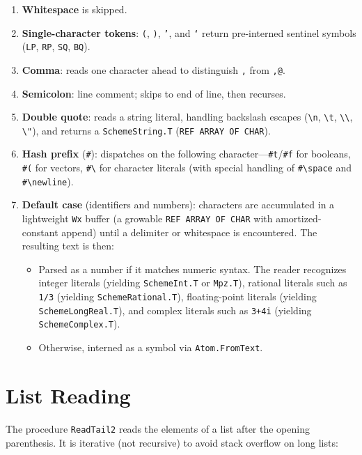 \documentclass[12pt]{report}
\begin{document}
\begin{enumerate}
\item \textbf{Whitespace} is skipped.
\item \textbf{Single-character tokens}: \texttt{(}, \texttt{)}, \texttt{'},
  and \texttt{`} return pre-interned sentinel symbols
  (\texttt{LP}, \texttt{RP}, \texttt{SQ}, \texttt{BQ}).
\item \textbf{Comma}: reads one character ahead to distinguish \texttt{,}
  from \texttt{,@}.
\item \textbf{Semicolon}: line comment; skips to end of line, then recurses.
\item \textbf{Double quote}: reads a string literal, handling backslash
  escapes (\texttt{\textbackslash n}, \texttt{\textbackslash t},
  \texttt{\textbackslash\textbackslash}, \texttt{\textbackslash "}),
  and returns a \texttt{SchemeString.T} (\texttt{REF ARRAY OF CHAR}).
\item \textbf{Hash prefix} (\texttt{\#}): dispatches on the following
  character---\texttt{\#t}/\texttt{\#f} for booleans,
  \texttt{\#(} for vectors, \texttt{\#\textbackslash} for character
  literals (with special handling of \texttt{\#\textbackslash space}
  and \texttt{\#\textbackslash newline}).
\item \textbf{Default case} (identifiers and numbers): characters are
  accumulated in a lightweight \texttt{Wx} buffer (a growable
  \texttt{REF ARRAY OF CHAR} with amortized-constant append) until a
  delimiter or whitespace is encountered.  The resulting text is then:
  \begin{itemize}
  \item Parsed as a number if it matches numeric syntax.  The reader
    recognizes integer literals (yielding \texttt{SchemeInt.T} or
    \texttt{Mpz.T}), rational literals such as \texttt{1/3} (yielding
    \texttt{SchemeRational.T}), floating-point literals (yielding
    \texttt{SchemeLongReal.T}), and complex literals such as
    \texttt{3+4i} (yielding \texttt{SchemeComplex.T}).
  \item Otherwise, interned as a symbol via \texttt{Atom.FromText}.
  \end{itemize}
\end{enumerate}

\section{List Reading}

The procedure \texttt{ReadTail2} reads the elements of a list after the
opening parenthesis.  It is iterative (not recursive) to avoid stack
overflow on long lists:
\end{document}
